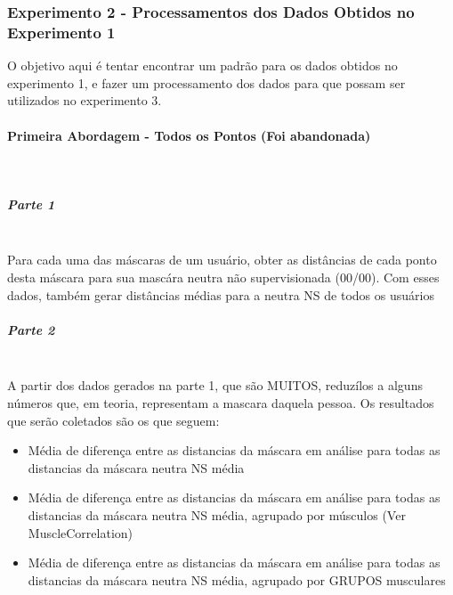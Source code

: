 \subsubsection{Experimento 2 - Processamentos dos Dados Obtidos no Experimento 1}
O objetivo aqui é tentar encontrar um padrão para os dados obtidos no experimento 1, e fazer um processamento dos dados para que possam ser utilizados no experimento 3.

\paragraph{Primeira Abordagem - Todos os Pontos (Foi abandonada)}\mbox{}\\
\subparagraph{Parte 1}\mbox{}\\
Para cada uma das máscaras de um usuário, obter as distâncias de cada ponto desta máscara para sua mascára neutra não supervisionada (00/00). Com esses dados, também gerar distâncias médias para a neutra NS de todos os usuários

\subparagraph{Parte 2}\mbox{}\\
A partir dos dados gerados na parte 1, que são MUITOS, reduzílos a alguns números que, em teoria, representam a mascara daquela pessoa. Os resultados que serão coletados são os que seguem:
\begin{itemize}
    \item{Média de diferença entre as distancias da máscara em análise para todas as distancias da máscara neutra NS média}
    \item{Média de diferença entre as distancias da máscara em análise para todas as distancias da máscara neutra NS média, agrupado por músculos (Ver MuscleCorrelation)}
    \item{Média de diferença entre as distancias da máscara em análise para todas as distancias da máscara neutra NS média, agrupado por GRUPOS musculares}
\end{itemize}

